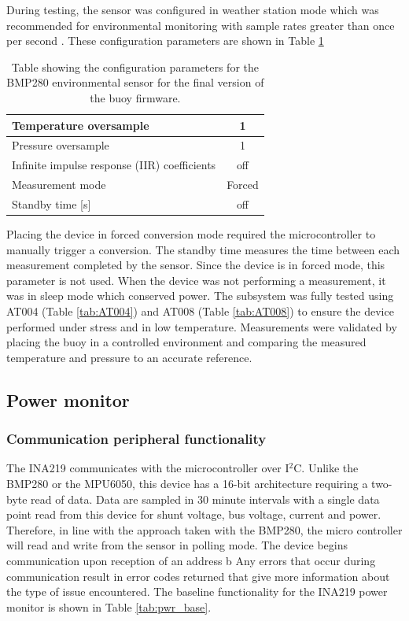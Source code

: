 During testing, the sensor was configured in weather station mode which was recommended for environmental monitoring with sample rates greater than once per second \cite{BMP280_Datasheet}. These configuration parameters are shown in Table \ref{tab:bmp_param}

\begin{table}[H]
	\centering
	\caption{Table showing the configuration parameters for the BMP280 environmental sensor for the final version of the buoy firmware.}
	\label{tab:bmp_param}
	\begin{tabular}{l c}
		\hline
		\hline
		Temperature oversample & 1\\
		\hline
		Pressure oversample & 1\\
		\hline
		Infinite impulse response (IIR) coefficients & off\\
		\hline
		Measurement mode & Forced \\
		\hline
		Standby time [s] & off\\
		\hline
		\hline
	\end{tabular}
\end{table}

 Placing the device in forced conversion mode required the microcontroller to manually trigger a conversion. The standby time measures the time between each measurement completed by the sensor. Since the device is in forced mode, this parameter is not used. When the device was not performing a measurement, it was in sleep mode which conserved power. The subsystem was fully tested using AT004 (Table \ref{tab:AT004}) and AT008 (Table \ref{tab:AT008}) to ensure the device performed under stress and in low temperature. Measurements were validated by placing the buoy in a controlled environment and comparing the measured temperature and pressure to an accurate reference.
\subsection{Power monitor}


\subsubsection{Communication peripheral functionality}

The INA219 communicates with the microcontroller over I$^2$C. Unlike the BMP280 or the MPU6050, this device has a 16-bit architecture requiring a two-byte read of data. Data are sampled in 30 minute intervals with a single data point read from this device for shunt voltage, bus voltage, current and power. Therefore, in line with the approach taken with the BMP280, the micro controller will read and write from the sensor in polling mode. The device begins communication upon reception of an address b Any errors that occur during communication result in error codes returned that give more information about the type of issue encountered. The baseline functionality for the INA219 power monitor is shown in Table \ref{tab:pwr_base}.

